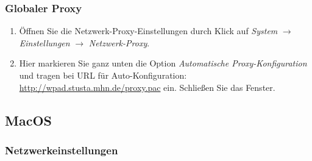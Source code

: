 \documentclass[a4paper,12pt]{scrartcl}
\begin{document}
\subsubsection*{Globaler Proxy}

\begin{enumerate}
	\item Öffnen Sie die Netzwerk-Proxy-Einstellungen durch Klick auf \emph{System} $\rightarrow$ \emph{Einstellungen} $\rightarrow$ \emph{Netzwerk-Proxy}.
	\item Hier markieren Sie ganz unten die Option \emph{Automatische Proxy-Konfiguration} und tragen bei URL für Auto-Konfiguration: \url{http://wpad.stusta.mhn.de/proxy.pac} ein. Schließen Sie das Fenster. 
\end{enumerate}

\pagebreak

\subsection{MacOS}

\subsubsection*{Netzwerkeinstellungen}
\end{document}
